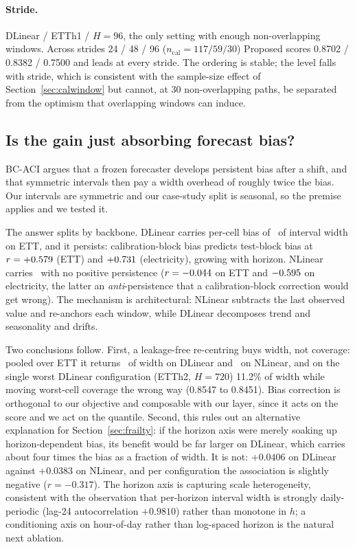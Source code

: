 \documentclass[11pt]{article}
\begin{document}
\paragraph{Stride.} DLinear / ETTh1 / $H = 96$, the only setting with enough non-overlapping windows. Across strides 24 / 48 / 96 ($n_{\mathrm{cal}} = 117 / 59 / 30$) Proposed scores 0.8702 / 0.8382 / 0.7500 and leads at every stride. The ordering is stable; the level falls with stride, which is consistent with the sample-size effect of Section~\ref{sec:calwindow} but cannot, at 30 non-overlapping paths, be separated from the optimism that overlapping windows can induce.

\subsection{Is the gain just absorbing forecast bias?}\label{sec:bias}

BC-ACI \citep{bcaci} argues that a frozen forecaster develops persistent bias after a shift, and that symmetric intervals then pay a width overhead of roughly twice the bias. Our intervals are symmetric and our case-study split is seasonal, so the premise applies and we tested it.

The answer splits by backbone. DLinear carries per-cell bias of \biasettDLinearFrac\ of interval width on ETT, and it persists: calibration-block bias predicts test-block bias at $r = +0.579$ (ETT) and $+0.731$ (electricity), growing with horizon. NLinear carries \biasettNLinearFrac\ with no positive persistence ($r = -0.044$ on ETT and $-0.595$ on electricity, the latter an \emph{anti}-persistence that a calibration-block correction would get wrong). The mechanism is architectural: NLinear subtracts the last observed value and re-anchors each window, while DLinear decomposes trend and seasonality and drifts.

Two conclusions follow. First, a leakage-free re-centring buys width, not coverage: pooled over ETT it returns \biasettDLinearRecentre\ of width on DLinear and \biasettNLinearRecentre\ on NLinear, and on the single worst DLinear configuration (ETTh2, $H = 720$) 11.2\% of width while moving worst-cell coverage the wrong way (0.8547 to 0.8451). Bias correction is orthogonal to our objective and composable with our layer, since it acts on the score and we act on the quantile. Second, this rules out an alternative explanation for Section~\ref{sec:frailty}: if the horizon axis were merely soaking up horizon-dependent bias, its benefit would be far larger on DLinear, which carries about four times the bias as a fraction of width. It is not: $+0.0406$ on DLinear against $+0.0383$ on NLinear, and per configuration the association is slightly negative ($r = -0.317$). The horizon axis is capturing scale heterogeneity, consistent with the observation that per-horizon interval width is strongly daily-periodic (lag-24 autocorrelation $+0.9810$) rather than monotone in $h$; a conditioning axis on hour-of-day rather than log-spaced horizon is the natural next ablation.
\end{document}
